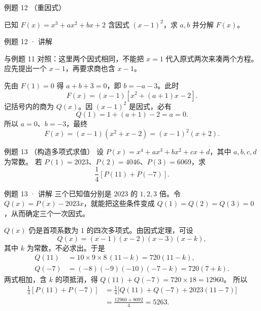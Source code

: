 
\par\noindent\begin{minipage}{\linewidth}

\begin{problem}{例题 12 （重因式）}

已知 $F(x)=x^3+ax^2+bx+2$ 含因式 $(x-1)^2$，求 $a,b$ 并分解 $F(x)$。

\end{problem}

\begin{solution}[breakable=false]{例题 12 · 讲解}

\think 与例题 11 对照：这里两个因式相同，不能把 $x=1$ 代入原式两次来凑两个方程。应先提出一个 $x-1$，再要求商也含 $x-1$。

\solve 先由 $F(1)=0$ 得 $a+b+3=0$，即 $b=-a-3$。此时
\[F(x)=(x-1)[x^2+(a+1)x-2].\]
记括号内的商为 $Q(x)$。因 $(x-1)^2$ 是因式，必有
\[Q(1)=1+(a+1)-2=a=0.\]
所以 $a=0$、$b=-3$，最终
\[F(x)=(x-1)(x^2+x-2)=(x-1)^2(x+2).\]


\end{solution}

\end{minipage}\par


\begin{problem}{例题 13 （构造多项式求值）}
设 $P(x)=x^4+ax^3+bx^2+cx+d$，其中 $a,b,c,d$ 为常数。
若 $P(1)=2023$、$P(2)=4046$、$P(3)=6069$，求
\[\frac14[P(11)+P(-7)].\]
\end{problem}

\begin{solution}{例题 13 · 讲解}
\think 三个已知值分别是 $2023$ 的 $1,2,3$ 倍。令 $Q(x)=P(x)-2023x$，就能把这些条件变成 $Q(1)=Q(2)=Q(3)=0$，从而确定三个一次因式。

\solve $Q(x)$ 仍是首项系数为 $1$ 的四次多项式。由因式定理，可设
\[Q(x)=(x-1)(x-2)(x-3)(x-k),\]
其中 $k$ 为常数，不必求出。于是
\begin{align*}
Q(11)&=10\times9\times8\,(11-k)=720(11-k),\\
Q(-7)&=(-8)(-9)(-10)(-7-k)=720(7+k).
\end{align*}
两式相加，含 $k$ 的项抵消，得 $Q(11)+Q(-7)=720\times18=12960$。
所以
\begin{align*}
\frac14[P(11)+P(-7)]
&=\frac14\bigl[Q(11)+Q(-7)+2023(11-7)\bigr]\\
&=\frac{12960+8092}{4}=5263.
\end{align*}

\end{solution}

